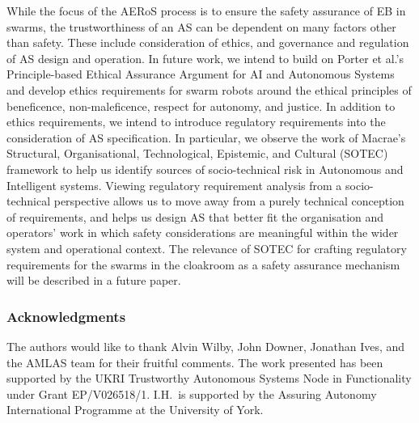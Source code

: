 \documentclass[runningheads]{llncs}
\begin{document}
While the focus of the AERoS process is to ensure the safety assurance of EB in swarms, the trustworthiness of an AS can be dependent on many factors other than safety. These include consideration of ethics, and governance and regulation of AS design and operation. 
In future work, we intend to build on Porter et al.’s \cite{Porter2022} Principle-based Ethical Assurance Argument for AI and Autonomous Systems and develop ethics requirements for swarm robots around the ethical principles of beneficence, non-maleficence, respect for autonomy, and justice. 
In addition to ethics requirements, we intend to introduce regulatory requirements into the consideration of AS specification. In particular, we observe the work of Macrae’s~\cite{macrae2021learning} Structural, Organisational, Technological, Epistemic, and Cultural (SOTEC) framework to help us identify sources of socio-technical risk in Autonomous and Intelligent systems. Viewing regulatory requirement analysis from a socio-technical perspective allows us to move away from a purely technical conception of requirements, and helps us design AS that better fit the organisation and operators’ work in which safety considerations are meaningful within the wider system and operational context. The relevance of SOTEC for crafting regulatory requirements for the swarms in the cloakroom as a safety assurance mechanism will be described in a future paper. 

\subsubsection*{Acknowledgments}
The authors would like to thank Alvin Wilby, John Downer, Jonathan Ives, and the AMLAS team for their fruitful comments. The work presented has been supported by the UKRI Trustworthy Autonomous Systems Node in Functionality under Grant EP/V026518/1. I.H.\ is supported by the Assuring Autonomy International Programme at the University of York.
%
%
%

%

\vspace{-1ex}
%
\end{document}
